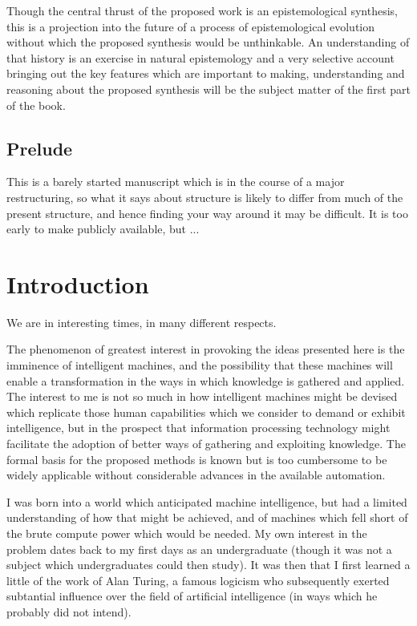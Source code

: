 \documentclass[10pt,titlepage]{book}
\begin{document}
Though the central thrust of the proposed work is an epistemological synthesis, this is a projection into the future of a process of epistemological evolution without which the proposed synthesis would be unthinkable.  An understanding of that history is an exercise in natural epistemology and a very selective account bringing out the key features which are important to making, understanding and reasoning about the proposed synthesis will be the subject matter of the first part of the book.

\section*{Prelude}

This is a barely started manuscript which is in the course of a major restructuring, so what it says about structure is likely to differ from much of the present structure, and hence finding your way around it may be difficult.
It is too early to make publicly available, but ...

\chapter{Introduction}

We are in interesting times, in many different respects.

The phenomenon of greatest interest in provoking the ideas presented here is the imminence of intelligent machines, and the possibility that these machines will enable a transformation in the ways in which knowledge is gathered and applied.
The interest to me is not so much in how intelligent machines might be devised which replicate those human capabilities which we consider to demand or exhibit intelligence, but in the prospect that information processing technology might facilitate the adoption of better ways of gathering and exploiting knowledge.
The formal basis for the proposed methods is known but is too cumbersome to be widely applicable without considerable advances in the available automation.

I was born into a world which anticipated machine intelligence, but had a limited understanding of how that might be achieved, and of machines which fell short of the brute compute power which would be needed. 
My own interest in the problem dates back to my first days as an undergraduate (though it was not a subject which undergraduates could then study).
It was then that I first learned a little of the work of Alan Turing, a famous logicism who subsequently exerted subtantial influence over the field of artificial intelligence (in ways which he probably did not intend).
\end{document}
